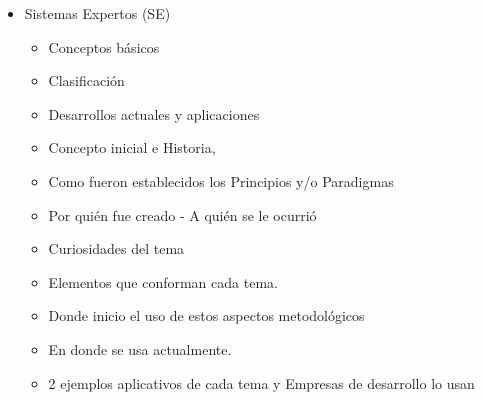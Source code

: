 \documentclass[12pt]{article}
\begin{document}
\begin{itemize}
    \item Sistemas Expertos (SE)
    		\begin{itemize}
			\item Conceptos básicos
			\item Clasificación
			\item Desarrollos actuales y aplicaciones
			\item Concepto inicial e Historia,
			\item Como fueron establecidos los Principios y/o Paradigmas
			\item Por quién fue creado - A quién se le ocurrió
			\item Curiosidades del tema
			\item Elementos que conforman cada tema.
			\item Donde inicio el uso de estos aspectos metodológicos
			\item En donde se usa actualmente.
			 \item 2 ejemplos aplicativos de cada tema y Empresas de desarrollo lo usan
		\end{itemize}
    
    
    
    
  
    
\end{itemize}
\end{document}
